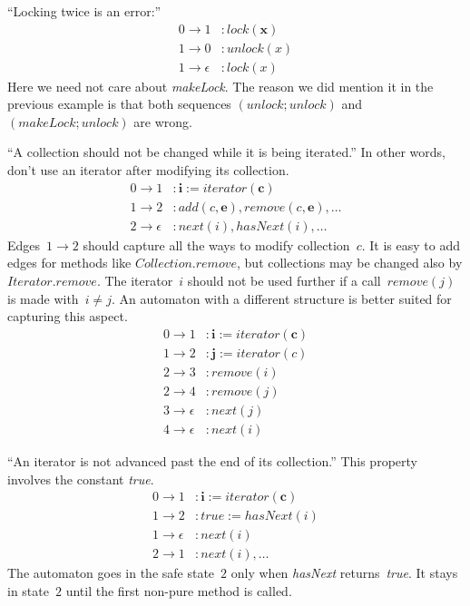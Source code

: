 \documentclass[a4paper]{article}
\theoremstyle{slanted}
\theoremstyle{definition}
\theoremstyle{remark}
\begin{document}
``Locking twice is an error:''
\begin{equation}
\begin{aligned}
0\to1&: \mathit{lock}(\mathbf x)\\
1\to0&: \mathit{unlock}(x)\\
1\to\epsilon&: \mathit{lock}(x)
\end{aligned}
\end{equation}
Here we need not care about \textit{makeLock}.
The reason we did mention it in the previous example is that both sequences $(\mathit{unlock}; \mathit{unlock})$ and $(\mathit{makeLock}; \mathit{unlock})$ are wrong.

``A collection should not be changed while it is being iterated.''
In other words, don't use an iterator after modifying its collection.
\begin{equation}\label{eq:iter1}
\begin{aligned}
0\to1&: \mathbf{i} := \mathit{iterator}(\mathbf{c})\\
1\to2&: \mathit{add}(c, \mathbf{e}), \mathit{remove}(c, \mathbf{e}), \ldots \\
2\to\epsilon&: \mathit{next}(i), \mathit{hasNext(i)}, \ldots
\end{aligned}
\end{equation}
Edges~$1\to2$ should capture all the ways to modify collection~$c$.
It is easy to add edges for methods like $\mathit{Collection}.\mathit{remove}$, but collections may be changed also by $\mathit{Iterator}.\mathit{remove}$.
The iterator~$i$ should not be used further if a call~$\mathit{remove}(j)$ is made with~$i\ne j$.
An automaton with a different structure is better suited for capturing this aspect.
\begin{equation}\label{eq:iter2}
\begin{aligned}
0\to1&: \mathbf{i} := \mathit{iterator}(\mathbf{c})\\
1\to2&: \mathbf{j} := \mathit{iterator}(c)\\
2\to3&: \mathit{remove}(i)\\
2\to4&: \mathit{remove}(j)\\
3\to\epsilon&: \mathit{next}(j)\\
4\to\epsilon&: \mathit{next}(i)
\end{aligned}
\end{equation}

``An iterator is not advanced past the end of its collection.''
This property involves the constant \textit{true}.
\begin{equation}\label{eq:iter3}
\begin{aligned}
0\to1&: \mathbf{i} := \mathit{iterator}(\mathbf{c}) \\
1\to2&: \mathit{true} := \mathit{hasNext}(i) \\
1\to\epsilon&: \mathit{next}(i) \\
2\to1&: \mathit{next}(i), \ldots
\end{aligned}
\end{equation}
The automaton goes in the safe state~$2$ only when \textit{hasNext} returns~\textit{true}.
It stays in state~$2$ until the first non-pure method is called.
\end{document}
